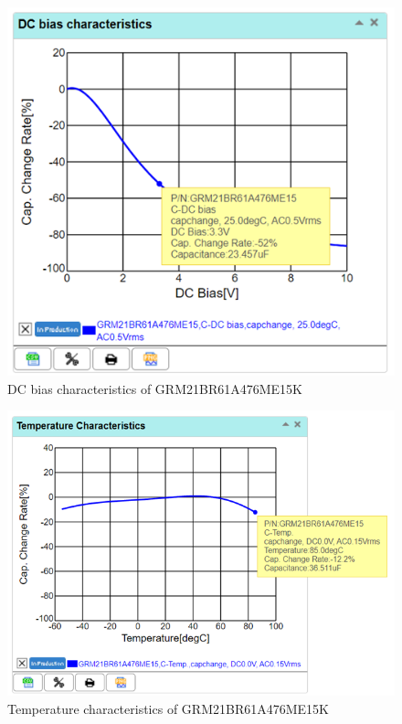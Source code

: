 \documentclass[a4paper,11pt]{article}%
\begin{document}
    \begin{figure}[H]
        \centering
        \includegraphics[width=\textwidth]{figures/Update5/DC bias characteristics of capacitor .png}
        \caption{DC bias characteristics of GRM21BR61A476ME15K}
    \end{figure}

    \begin{figure}[H]
        \centering
        \includegraphics[width=\textwidth]{figures/Update5/Temperature characteristics of capacitor.png}
        \caption{Temperature characteristics of GRM21BR61A476ME15K}
    \end{figure}
\end{document}

